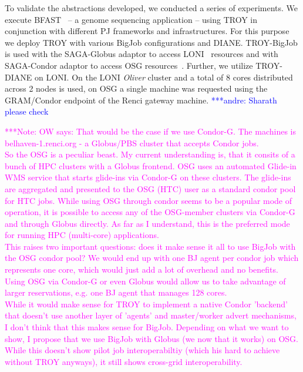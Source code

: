 \documentclass[conference,final]{IEEEtran}
\newcommand{\alnote}[1]{ {\textcolor{blue} { ***andre: #1 }}}
\newcommand{\note}[1]{ {\textcolor{magenta} { ***Note: #1 }}}
\newcommand{\alnote}[1]{}
\newcommand{\note}[1]{}
\begin{document}
To validate the abstractions developed, we conducted a series of
experiments. We execute BFAST~\cite{bfast2009} -- a genome sequencing
application -- using TROY in conjunction with different PJ frameworks
and infrastructures. For this purpose we deploy TROY with various
BigJob configurations and DIANE. TROY-BigJob is used with the
SAGA-Globus adaptor to access LONI~\cite{loni} resources and with
SAGA-Condor adaptor to access OSG
resources~\cite{1742-6596-78-1-012057}.  Further, we utilize
TROY-DIANE on LONI. On the LONI \textit{Oliver} cluster and a total of 8 cores
distributed across 2 nodes is used, on OSG a single machine was
requested using the GRAM/Condor endpoint of the Renci gateway machine.
\alnote{Sharath please check}

\note{OW says: That would be the case if we use Condor-G. The machines
is belhaven-1.renci.org - a Globus/PBS cluster that accepts Condor jobs.\\
So the OSG is a peculiar beast. My current understanding is, that it consits 
of a bunch of HPC clusters with a Globus frontend. OSG uses an automated 
Glide-in WMS service that starts glide-ins via Condor-G on these clusters.
The glide-ins are aggregated and presented to the OSG (HTC) user as a 
standard condor pool for HTC jobs. While using OSG through condor seems 
to be a popular mode of operation, it is possible to access any of the 
OSG-member clusters via Condor-G and through Globus directly. As far as I
understand, this is the preferred mode for running HPC (multi-core) 
applications.\\
This raises two important questions: does it make sense it all to use
BigJob with the OSG condor pool? We would end up with one BJ agent per
condor job which represents one core, which would just add a lot of overhead and
no benefits. Using OSG via Condor-G or even Globus would allow us to
take advantage of larger reservations, e.g. one BJ agent that manages
128 cores.\\
While it would make sense for TROY to implement a native Condor 'backend'
that doesn't use another layer of 'agents' and master/worker advert 
mechanisms, I don't think that this makes sense for BigJob. Depending on 
what we want to show, I propose that we use BigJob with Globus (we now that 
it works) on OSG. While this doesn't show pilot job interoperabiltiy
(which his hard to achieve without TROY anyways), it still shows cross-grid
interoperability.}


\end{document}
